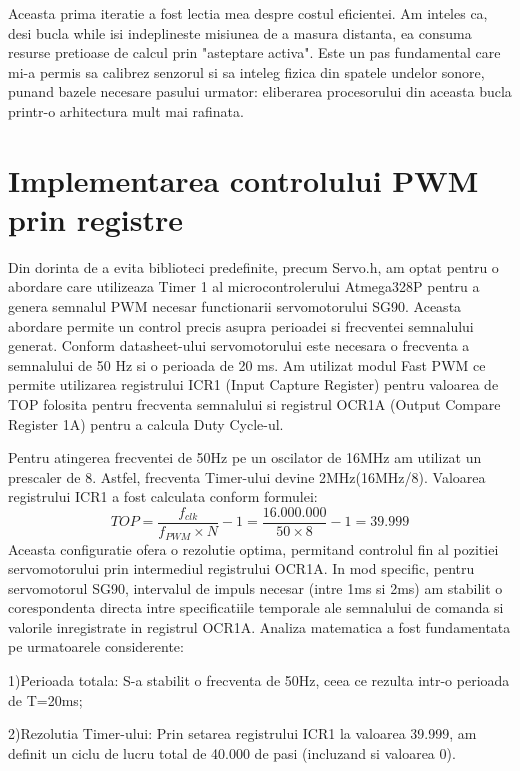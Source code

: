 \documentclass[conference]{IEEEtran}
\begin{document}
Aceasta prima iteratie a fost lectia mea despre costul eficientei. Am inteles ca, desi bucla while isi indeplineste misiunea de a masura distanta, ea consuma resurse pretioase de calcul prin "asteptare activa". Este un pas fundamental care mi-a permis sa calibrez senzorul si sa inteleg fizica din spatele undelor sonore, punand bazele necesare pasului urmator: eliberarea procesorului din aceasta bucla printr-o arhitectura mult mai rafinata. 
 

\section{Implementarea controlului PWM prin registre}
Din dorinta de a evita biblioteci predefinite, precum Servo.h, am optat pentru o abordare care utilizeaza Timer 1 al microcontrolerului Atmega328P pentru a genera semnalul PWM necesar functionarii servomotorului SG90. Aceasta abordare permite un control precis asupra perioadei si frecventei semnalului generat. Conform datasheet-ului servomotorului este necesara o frecventa a semnalului de 50 Hz si o perioada de 20 ms. Am utilizat modul Fast PWM ce permite utilizarea registrului ICR1 (Input Capture Register) pentru valoarea de TOP folosita pentru frecventa semnalului si registrul OCR1A (Output Compare Register 1A) pentru a calcula Duty Cycle-ul. 

Pentru atingerea frecventei de 50Hz pe un oscilator de 16MHz am utilizat un prescaler de 8. Astfel, frecventa Timer-ului devine 2MHz(16MHz/8). Valoarea registrului ICR1 a fost calculata conform formulei: \[
TOP = \frac{f_{clk}}{f_{PWM} \times N} - 1 = \frac{16.000.000}{50 \times 8} - 1 = 39.999
\]
Aceasta configuratie ofera o rezolutie optima, permitand controlul fin al pozitiei servomotorului prin intermediul registrului OCR1A. In mod specific, pentru servomotorul SG90, intervalul de impuls necesar (intre 1ms si 2ms) am stabilit o corespondenta directa intre specificatiile temporale ale semnalului de comanda si valorile inregistrate in registrul OCR1A. Analiza matematica a fost fundamentata pe urmatoarele considerente: 

 1)Perioada totala: S-a stabilit o frecventa de 50Hz, ceea ce rezulta intr-o perioada de T=20ms;

 2)Rezolutia Timer-ului: Prin setarea registrului ICR1 la valoarea 39.999, am definit un ciclu de lucru total de 40.000 de pasi (incluzand si valoarea 0).
\end{document}
